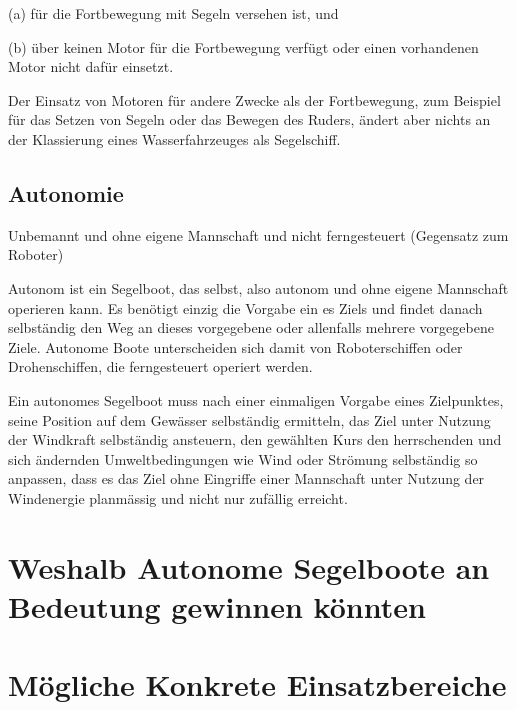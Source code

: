  (a) für die Fortbewegung mit Segeln versehen ist, und 

 (b) über keinen Motor für die Fortbewegung verfügt oder einen vorhandenen Motor nicht dafür einsetzt. 

Der Einsatz von Motoren für andere Zwecke als der Fortbewegung, zum Beispiel für das Setzen von Segeln oder das Bewegen des Ruders, ändert aber nichts an der Klassierung eines Wasserfahrzeuges als Segelschiff. 

\subsection{Autonomie}
Unbemannt und ohne eigene Mannschaft und nicht ferngesteuert (Gegensatz zum Roboter)

Autonom ist ein Segelboot, das selbst, also autonom und ohne eigene Mannschaft operieren kann. Es benötigt einzig die Vorgabe ein es Ziels und findet danach selbständig den Weg an dieses vorgegebene oder allenfalls mehrere vorgegebene Ziele. Autonome Boote unterscheiden sich damit von Roboterschiffen oder Drohenschiffen, die ferngesteuert operiert werden. 

Ein autonomes Segelboot muss nach einer einmaligen Vorgabe eines Zielpunktes, seine Position auf dem Gewässer selbständig ermitteln, das Ziel unter Nutzung der Windkraft selbständig ansteuern, den gewählten Kurs den herrschenden und sich ändernden Umweltbedingungen wie Wind oder Strömung selbständig so anpassen, dass es das Ziel ohne Eingriffe einer Mannschaft unter Nutzung der Windenergie planmässig und nicht nur zufällig erreicht.


\section{Weshalb Autonome Segelboote an Bedeutung gewinnen könnten}

\section{Mögliche Konkrete Einsatzbereiche}
